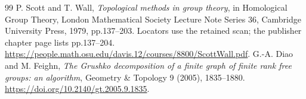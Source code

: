 \documentclass[10pt]{amsbook}
\numberwithin{section}{chapter}
\numberwithin{equation}{chapter}
\begin{document}
\begin{thebibliography}{99}
 P. Scott and T. Wall,
\emph{Topological methods in group theory}, in Homological Group Theory,
London Mathematical Society Lecture Note Series 36, Cambridge University Press,
1979, pp.137--203. Locators use the retained scan; the publisher chapter page
lists pp.137--204. \url{https://people.math.osu.edu/davis.12/courses/8800/ScottWall.pdf}.
 G.-A. Diao and M. Feighn,
\emph{The Grushko decomposition of a finite graph of finite rank free groups:
an algorithm}, Geometry \& Topology 9 (2005), 1835--1880.
\url{https://doi.org/10.2140/gt.2005.9.1835}.

\end{thebibliography}
\printindex
\end{document}

